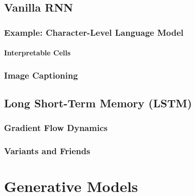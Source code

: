 	\section{Vanilla RNN} %

		\subsection{Example: Character-Level Language Model} %

			\subsubsection{Interpretable Cells} %

		\subsection{Image Captioning} %

	\section{Long Short-Term Memory (LSTM)} %

		\subsection{Gradient Flow Dynamics} %

		\subsection{Variants and Friends} %

\chapter{Generative Models} %

